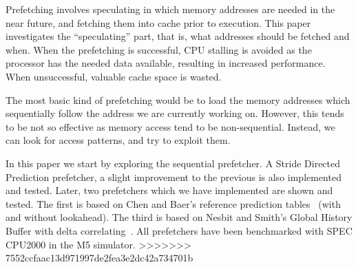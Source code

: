 Prefetching involves speculating in which memory addresses are needed
in the near future, and fetching them into cache prior to
execution. This paper investigates the ``speculating'' part, that is,
what addresses should be fetched and when. When the prefetching is
successful, CPU stalling is avoided as the processor has the needed
data available, resulting in increased performance. When unsuccessful,
valuable cache space is wasted.

The most basic kind of prefetching would be to load the memory
addresses which sequentially follow the address we are currently
working on. However, this tends to be not so effective as memory
access tend to be non-sequential. Instead, we can look for access
patterns, and try to exploit them.

In this paper we start by exploring the sequential prefetcher. A
Stride Directed Prediction prefetcher, a slight improvement to the
previous is also implemented and tested. Later, two prefetchers which we have implemented are shown
and tested. The first is based on Chen and Baer's reference
prediction tables~\cite{chen_baer_1995} (with and without
lookahead). The third is based on Nesbit and Smith's Global History
Buffer with delta correlating~\cite{nesbit_smith_2005}. All
prefetchers have been benchmarked with SPEC CPU2000 in the M5
simulator.
>>>>>>> 7552ccfaac13d971997de2fea3e2dc42a734701b

